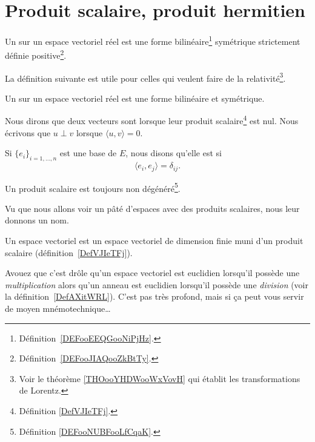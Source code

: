 \section{Produit scalaire, produit hermitien}

\begin{definition}\label{DefVJIeTFj}
    Un  sur un espace vectoriel réel est une forme bilinéaire\footnote{Définition~\ref{DEFooEEQGooNiPjHz}.} symétrique strictement définie positive\footnote{Définition~\ref{DEFooJIAQooZkBtTy}.}.
\end{definition}

La définition suivante est utile pour celles qui veulent faire de la relativité\footnote{Voir le théorème \ref{THOooYHDWooWxVovH} qui établit les transformations de Lorentz.}.
\begin{definition}      \label{DEFooLPBGooXLxubc}
    Un  sur un espace vectoriel réel est une forme bilinéaire et symétrique.
\end{definition}

\begin{definition}      \label{DEFooZBWTooIqXwRp}
    Nous dirons que deux vecteurs sont  lorsque leur produit scalaire\footnote{Définition \ref{DefVJIeTFj}.} est nul. Nous écrivons que \( u\perp v\) lorsque \( \langle u, v\rangle =0\).

    Si \( \{ e_i \}_{i=1,\ldots, n}\) est une base de \( E\), nous disons qu'elle est  si 
    \begin{equation}
        \langle e_i, e_j\rangle =\delta_{ij}.
    \end{equation}
\end{definition}

\begin{lemma}       \label{LEMooLPUFooVCvnwW}
    Un produit scalaire est toujours non dégénéré\footnote{Définition \ref{DEFooNUBFooLfCqaK}.}.
\end{lemma}


Vu que nous allons voir un pâté d'espaces avec des produits scalaires, nous leur donnons un nom.
\begin{definition}\label{DefLZMcvfj} 
    Un espace vectoriel  est un espace vectoriel de dimension finie muni d'un produit scalaire (définition~\ref{DefVJIeTFj}).
\end{definition}
Avouez que c'est drôle qu'un espace vectoriel est euclidien lorsqu'il possède une \emph{multiplication} alors qu'un anneau est euclidien lorsqu'il possède une \emph{division} (voir la définition~\ref{DefAXitWRL}). C'est pas très profond, mais si ça peut vous servir de moyen mnémotechnique\ldots


